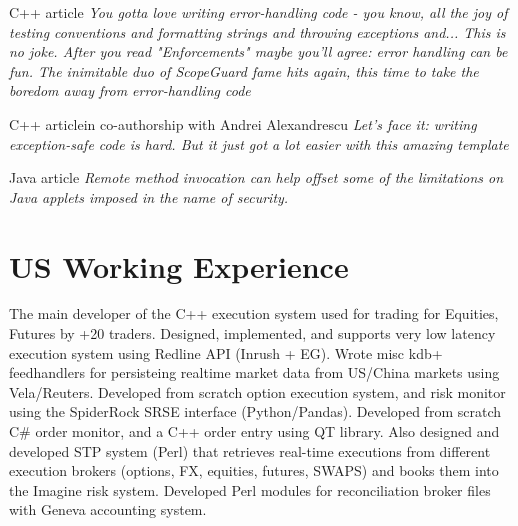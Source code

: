\documentclass[8pt,a4paper,sans]{moderncv}
\begin{document}
        {C++ article}
        {\textit{You gotta love writing error-handling code - you know, all the joy of testing conventions and
            formatting strings and throwing exceptions and... This is no joke. After you read "Enforcements"
            maybe you'll agree: error handling can be fun. The inimitable duo of ScopeGuard fame hits again,
            this time to take the boredom away from error-handling code}}
 
        {C++ article}{in co-authorship with Andrei Alexandrescu}
        {\textit{Let's face it: writing exception-safe code is hard. But it just got a lot easier with this amazing template}}

        {Java article}{}
        {\textit{Remote method invocation can help offset some of the limitations on Java applets imposed in the name of security.}}

\section{US Working Experience}

        {The main developer of the C++ execution system used for trading for Equities, Futures by +20 traders. 
          Designed, implemented, and supports very low latency execution system using Redline API (Inrush + EG).
          Wrote misc kdb+ feedhandlers for persisteing realtime market data from US/China markets using Vela/Reuters.
          Developed from scratch option execution system, and risk monitor using the SpiderRock SRSE interface (Python/Pandas).
          Developed from scratch C\# order monitor, and a C++ order entry using QT library.
          Also designed and developed STP system (Perl) that retrieves real-time executions from
          different execution brokers (options, FX, equities, futures, SWAPS) and books them into the Imagine risk system.
          Developed Perl modules for reconciliation broker files with Geneva accounting system.}
\end{document}
